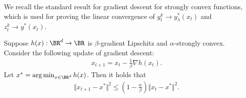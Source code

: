 We recall the standard result for gradient descent for strongly convex functions, which is used for proving the linear convergence of $y_t^k \rightarrow y_{\lambda}^*(x_t) $ and $z_{t}^k \rightarrow y^*(x_t)$.
\begin{thm} \label{thm:GD-SC}
Suppose $h(x): \BR^d \rightarrow \BR$ is  $\beta$-gradient Lipschitz and $\alpha$-strongly convex. Consider the following update of gradient descent:
\begin{align*}
    x_{t+1} = x_t - \frac{1}{\beta} \nabla h(x_t).
\end{align*}
Let $x^* = \arg \min_{x \in \BR^d} h(x)$. Then it holds that
\begin{align*}
    \Vert x_{t+1} - x^* \Vert^2 \le \left(1 - \frac{\alpha}{\beta} \right) \Vert x_t - x^* \Vert^2.
\end{align*}
\end{thm}








